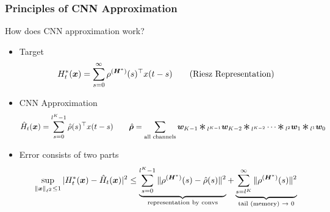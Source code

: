 \begin{frame}
	\frametitle{Principles of CNN Approximation}

	How does CNN approximation work?

	\begin{itemize}[<+->]
		\item Target
		\begin{equation*}
			H^*_t(\bm x)
			=
			\sum_{s = 0}^{\infty}
			\rho^{(\bm H^*)}(s)^\top
			x(t-s)
			\qquad
			\text{(Riesz Representation)}
		\end{equation*}
		\item CNN Approximation
		\begin{equation*}
			\begin{aligned}
				\wh{H}_t(\bm x)
				=
				\sum_{s = 0}^{l^K - 1}
				\wh{\rho} (s)^\tp
				x(t-s)
				\qquad
				\wh{\bm \rho}
=
				\sum_{\text{all channels}}
				{\bm w_{K-1}}
				\Conv{}_{l^{K-1}}
				{\bm w_{K-2}}
				\Conv{}_{l^{K-2}}
				\cdots
				\Conv{}_{l^{2}}
				{\bm w_{1}}
				\Conv{}_{l^{1}}
				{\bm w_{0}}
			\end{aligned}
		\end{equation*}
		\item
		Error consists of two parts
		\begin{equation*}
			\sup_{\|\bm x\|_{\ell^2} \leq 1}
			| H^*_t(\bm x) - \hat{H}_t(\bm x) |^2
			\leq
			\underbrace{
				\sum_{s=0}^{l^{K}-1}
				\| \rho^{(\bm H^*)}(s) - \hat{\rho}(s) \|^2
			}_{
				\text{representation by convs}
			}
			+
			\underbrace{
				\sum_{s=l^K}^{\infty}
				\| \rho^{(\bm H^*)}(s) \|^2
			}_{
				\text{tail (memory) $\rightarrow$ 0}
			}
		\end{equation*}
	\end{itemize}

\end{frame}

